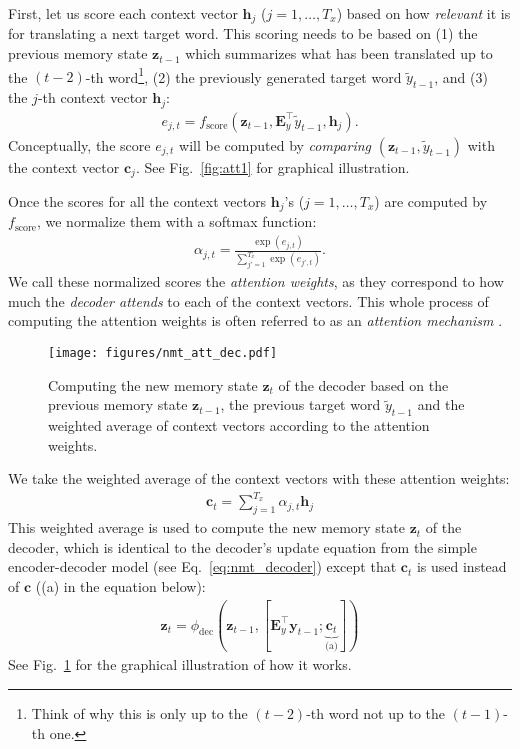 \documentclass{report}
\newcommand{\vect}[1]{\mathbf{#1}}
\newcommand{\matr}[1]{\mathbf{#1}}
\newcommand{\vc}[0]{\vect{c}}
\newcommand{\vh}[0]{\vect{h}}
\newcommand{\vz}[0]{\vect{z}}
\newcommand{\vy}[0]{\vect{y}}
\newcommand{\mE}[0]{\matr{E}}
\newcommand{\dec}{\text{dec}}
\begin{document}
First, let us score each context vector $\vh_j$ ($j=1, \ldots, T_x$) based on
how {\em relevant} it is for translating a next target word. This scoring needs
to be based on (1) the previous memory state $\vz_{t-1}$ which summarizes what
has been translated up to the $(t-2)$-th word\footnote{
    Think of why this is only up to the $(t-2)$-th word not up to the $(t-1)$-th
    one.
}, (2) the previously generated target word $\tilde{y}_{t-1}$, and (3) the
$j$-th context vector $\vh_j$: 
\begin{align}
    \label{eq:nmt_score}
    e_{j, t} = f_{\text{score}}(\vz_{t-1}, \mE_y^\top \tilde{y}_{t-1}, \vh_j).
\end{align}
Conceptually, the score $e_{j,t}$ will be computed by {\em comparing}
$(\vz_{t-1}, \tilde{y}_{t-1})$ with the context vector $\vc_j$. See
Fig.~\ref{fig:att1} for graphical illustration.

Once the scores for all the context vectors $\vh_j$'s ($j=1, \ldots, T_x$) are
computed by $f_{\text{score}}$, we normalize them with a softmax function:
\begin{align}
    \label{eq:att_weight}
    \alpha_{j, t} = \frac{\exp(e_{j,t})}{\sum_{j'=1}^{T_x} \exp(e_{j',t})}.
\end{align}
We call these normalized scores the {\em attention weights}, as they correspond
to how much the {\em decoder attends} to each of the context vectors. This whole
process of computing the attention weights is often referred to as an {\em
attention mechanism} \citep[see, e.g.,][]{cho2015describing}.

\begin{figure}[t]
    \centering
    \centering
    \texttt{[image: figures/nmt\_att\_dec.pdf]}

    \caption{Computing the new memory state $\vz_t$ of the decoder based on the
        previous memory state $\vz_{t-1}$, the previous target word
    $\tilde{y}_{t-1}$ and the weighted average of context vectors according to
the attention weights.}
    \label{fig:att2}
\end{figure}

We take the weighted average of the context vectors with these attention
weights:
\begin{align}
    \label{eq:td_context}
    \vc_t = \sum_{j=1}^{T_x} \alpha_{j, t} \vh_j
\end{align}
This weighted average is used to compute the new memory state $\vz_t$ of the
decoder, which is identical to the decoder's update equation from the simple
encoder-decoder model (see Eq.~\eqref{eq:nmt_decoder}) except that $\vc_t$ is
used instead of $\vc$ ((a) in the equation below):
\begin{align*}
    \vz_t = \phi_{\dec}\left( \vz_{t-1}, \left[ \mE_y^\top \vy_{t-1};
            \underbrace{\vc_t}_{\text{(a)}}
    \right]\right)
\end{align*}
See Fig.~\ref{fig:att2} for the graphical illustration of how it works.
\end{document}
